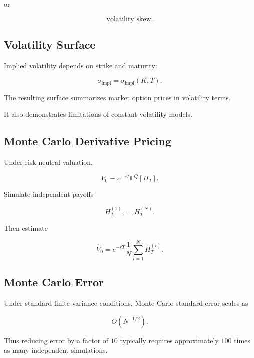 or

\[
\boxed{
\text{volatility skew}.
}
\]

\subsection{Volatility Surface}
\label{subsec:volatility-surface}

Implied volatility depends on strike and maturity:

\[
\boxed{
\sigma_{\mathrm{impl}}
=
\sigma_{\mathrm{impl}}(K,T).
}
\]

The resulting surface summarizes market option prices in volatility terms.

It also demonstrates limitations of constant-volatility models.

\subsection{Monte Carlo Derivative Pricing}
\label{subsec:monte-carlo-derivative-pricing}

Under risk-neutral valuation,

\[
V_0
=
e^{-rT}
\mathbb{E}^{Q}[H_T].
\]

Simulate independent payoffs

\[
H_T^{(1)},
\ldots,
H_T^{(N)}.
\]

Then estimate

\[
\boxed{
\hat V_0
=
e^{-rT}
\frac1N
\sum_{i=1}^{N}
H_T^{(i)}.
}
\]

\subsection{Monte Carlo Error}
\label{subsec:monte-carlo-finance-error}

Under standard finite-variance conditions, Monte Carlo standard error scales
as

\[
\boxed{
O(N^{-1/2}).
}
\]

Thus reducing error by a factor of \(10\) typically requires approximately
\(100\) times as many independent simulations.

